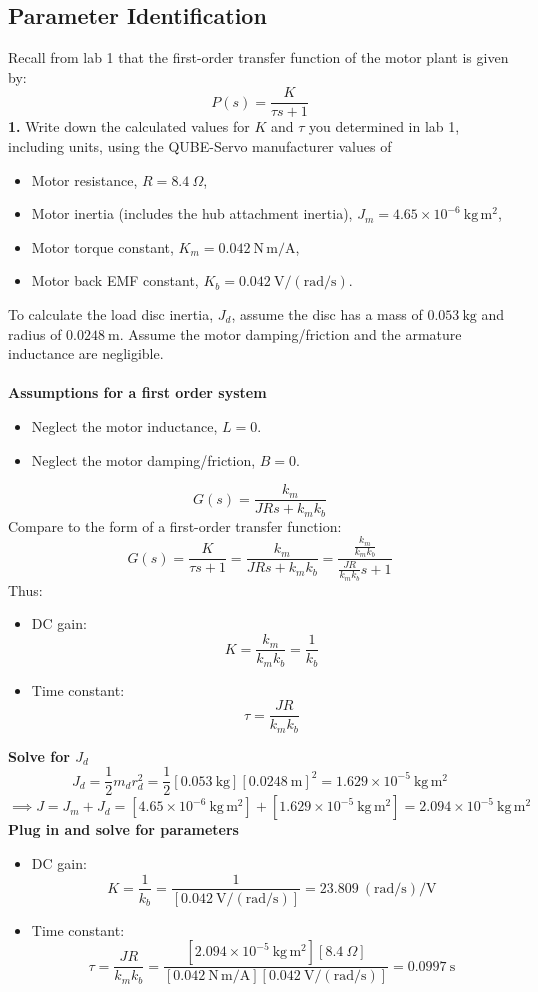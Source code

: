 ﻿\documentclass[12pt]{article}
\begin{document}
\subsection*{Parameter Identification}
Recall from lab 1 that the first-order transfer function of the motor plant is given by:
\[P(s) = \frac{K}{\tau s + 1}\]
\textbf{1.} Write down the calculated values for $K$ and $\tau$ you determined in lab 1, including units, using the QUBE-Servo manufacturer values of
\begin{itemize}
    \item Motor resistance, $R = 8.4~\Omega$,
    \item Motor inertia (includes the hub attachment inertia), $J_m = 4.65\times10^{-6}~\mathrm{kg\,m^2}$,
    \item Motor torque constant, $K_m = 0.042~\mathrm{N\,m/A}$,
    \item Motor back EMF constant, $K_b = 0.042~\mathrm{V/(rad/s)}$.
\end{itemize}
To calculate the load disc inertia, $J_d$, assume the disc has a mass of $0.053~\mathrm{kg}$ and radius of $0.0248~\mathrm{m}$. Assume the motor damping/friction and the armature inductance are negligible.\\\\
\textbf{Assumptions for a first order system}
\begin{itemize}
    \item Neglect the motor inductance, $L=0$.
    \item Neglect the motor damping/friction, $B=0$.
\end{itemize}
\[G(s) = \frac{k_m}{JRs+ k_mk_b}\]
Compare to the form of a first-order transfer function:
\[G(s) = \frac{K}{\tau s + 1} = \frac{k_m}{JRs+ k_mk_b} = \frac{\frac{k_m}{k_m k_b}}{\frac{JR}{k_m k_b}s+1}\]
Thus:
\begin{itemize}
    \item DC gain:
    \[K = \frac{k_m}{k_m k_b} = \frac{1}{k_b}\]
    \item Time constant:
    \[\tau = \frac{JR}{k_m k_b}\]
\end{itemize}
\textbf{Solve for $J_d$}
\[J_d = \frac{1}{2}m_d r_d ^2  = \frac{1}{2}[0.053~\mathrm{kg}][0.0248~\mathrm{m}]^2 = 1.629 \times 10^{-5}~\mathrm{kg\,m^2}\]
\[\implies J = J_m + J_d = [4.65\times10^{-6}~\mathrm{kg\,m^2}] + [1.629 \times 10^{-5}~\mathrm{kg\,m^2}] = 2.094 \times 10^{-5}~\mathrm{kg\,m^2}\]
\newpage
\textbf{Plug in and solve for parameters}
\begin{itemize}
    \item DC gain:
    \[K = \frac{1}{k_b} = \frac{1}{[0.042~\mathrm{V/(rad/s)}]} = \boxed{23.809~\mathrm{(rad/s)/V}}\]
    \item Time constant:
    \[\tau = \frac{JR}{k_m k_b} = \frac{[2.094 \times 10^{-5}~\mathrm{kg\,m^2}][8.4~\Omega]}{[0.042~\mathrm{N\,m/A}][0.042~\mathrm{V/(rad/s)}]} = \boxed{0.0997~\mathrm{s}}\]
\end{itemize}
\end{document}
